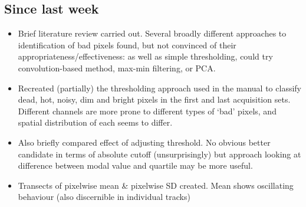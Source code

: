 \documentclass[10pt,fleqn]{article}
\begin{document}
\subsection*{Since last week}

\begin{itemize}

\item Brief literature review carried out. Several broadly different approaches to identification of bad pixels found, but not convinced of their appropriateness/effectiveness: as well as simple thresholding, could try convolution-based method, max-min filtering, or PCA.

\item Recreated (partially) the thresholding approach used in the manual to classify dead, hot, noisy, dim and bright pixels in the first and last acquisition sets. Different channels are more prone to different types of `bad' pixels, and spatial distribution of each seems to differ.

\item Also briefly compared effect of adjusting threshold. No obvious better candidate in terms of absolute cutoff (unsurprisingly) but approach looking at difference between modal value and quartile may be more useful.

\item Transects of pixelwise mean \& pixelwise SD created. Mean shows oscillating behaviour (also discernible in individual tracks)
\end{itemize}
\end{document}
